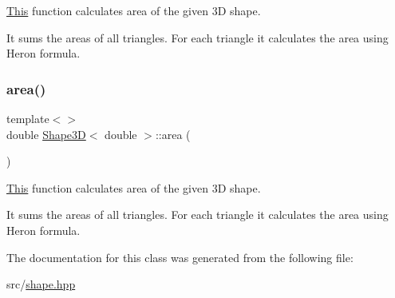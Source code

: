 \mbox{\hyperlink{classThis}{This}} function calculates area of the given 3D shape. 

It sums the areas of all triangles. For each triangle it calculates the area using Heron formula. \mbox{\label{classShape3D_a56f028736c84c6eb86f1d56e5a38c40d}} 
\subsubsection{\texorpdfstring{area()}{area()}\hspace{0.1cm}{\footnotesize\ttfamily [3/3]}}
{\footnotesize\ttfamily template$<$$>$ \\
double \mbox{\hyperlink{classShape3D}{Shape3D}}$<$ double $>$\+::area (\begin{DoxyParamCaption}{ }\end{DoxyParamCaption})\hspace{0.3cm}{\ttfamily [inline]}}



\mbox{\hyperlink{classThis}{This}} function calculates area of the given 3D shape. 

It sums the areas of all triangles. For each triangle it calculates the area using Heron formula. 

The documentation for this class was generated from the following file\+:\begin{DoxyCompactItemize}
\item 
src/\mbox{\hyperlink{shape_8hpp}{shape.\+hpp}}\end{DoxyCompactItemize}
